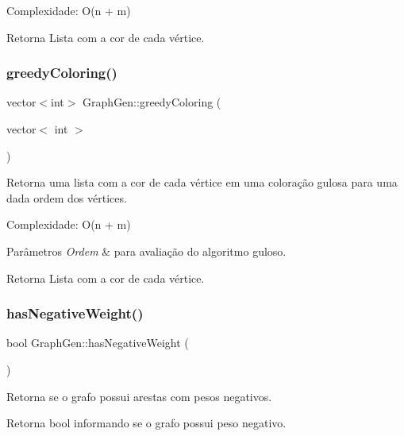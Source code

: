 Complexidade\+: O(n + m) \begin{DoxyReturn}{Retorna}
Lista com a cor de cada vértice. 
\end{DoxyReturn}
\mbox{\label{classGraphGen_a0690c98ce5c9dd544074f690fb79a8c6}} 
\subsubsection{\texorpdfstring{greedy\+Coloring()}{greedyColoring()}\hspace{0.1cm}{\footnotesize\ttfamily [2/2]}}
{\footnotesize\ttfamily vector$<$int$>$ Graph\+Gen\+::greedy\+Coloring (\begin{DoxyParamCaption}\item[{vector$<$ int $>$}]{ }\end{DoxyParamCaption})}

Retorna uma lista com a cor de cada vértice em uma coloração gulosa para uma dada ordem dos vértices.

Complexidade\+: O(n + m) 
\begin{DoxyParams}{Parâmetros}
{\em Ordem} & para avaliação do algoritmo guloso. \\
\hline
\end{DoxyParams}
\begin{DoxyReturn}{Retorna}
Lista com a cor de cada vértice. 
\end{DoxyReturn}
\mbox{\label{classGraphGen_a904cd0ab02e4c837ebd85226996fb4b2}} 
\subsubsection{\texorpdfstring{has\+Negative\+Weight()}{hasNegativeWeight()}}
{\footnotesize\ttfamily bool Graph\+Gen\+::has\+Negative\+Weight (\begin{DoxyParamCaption}{ }\end{DoxyParamCaption})}

Retorna se o grafo possui arestas com pesos negativos. \begin{DoxyReturn}{Retorna}
bool informando se o grafo possui peso negativo. 
\end{DoxyReturn}
\mbox{\label{classGraphGen_a41afdf97face9260e82749c4c770b2e7}} 
